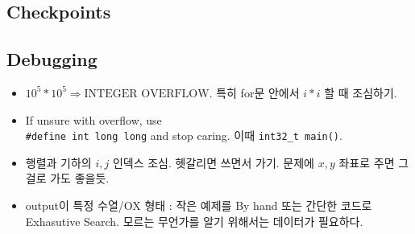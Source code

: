 \documentclass[landscape,8pt]{article}
\begin{document}
\begin{multicols}{2}
\section{Checkpoints}
  \subsection{Debugging}
    \begin{itemize}
      \item $10^5 * 10^5 \Rightarrow \text{INTEGER OVERFLOW}$. 특히 for문 안에서 $i*i$ 할 때 조심하기.
      \item If unsure with overflow, use \\
      \texttt{\#define int long long} and stop caring. 이때 \texttt{int32\_t main()}.
      \item 행렬과 기하의 $i, j$ 인덱스 조심. 헷갈리면 쓰면서 가기. 문제에 $x, y$ 좌표로 주면 그걸로 가도 좋을듯.
      \item output이 특정 수열/OX 형태 : 작은 예제를 By hand 또는 간단한 코드로 Exhasutive Search. 모르는 무언가를 알기 위해서는 데이터가 필요하다.
    \end{itemize}

\end{multicols}
\end{document}
